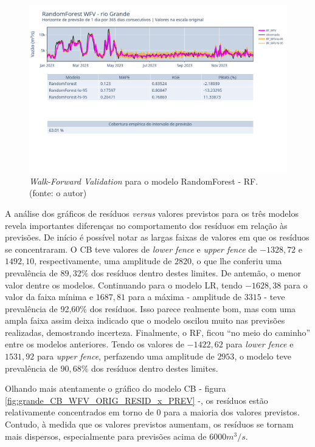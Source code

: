 \begin{figure}[!h]
	\centering
	\includegraphics[scale=0.33]{Figuras/rio_grande/wfv/RF/RF_WFV_ORIG.png}
	\caption{\textit{Walk-Forward Validation} para o modelo RandomForest - RF.\\(fonte: o autor)}
	\label{fig:grande_RF_WFV_ORIG}
\end{figure}
\clearpage

A análise dos gráficos de resíduos \textit{versus} valores previstos para os três modelos revela importantes diferenças no comportamento dos resíduos em relação às previsões. De início é possível notar as largas faixas de valores em que os resíduos se concentraram. O CB teve valores de \textit{lower fence} e \textit{upper fence} de $-1328,72$ e $1492,10$, respectivamente, uma amplitude de $2820$, o que lhe conferiu uma prevalência de $89,32\%$ dos resíduos dentro destes limites. De antemão, o menor valor dentre os modelos. Continuando para o modelo LR, tendo $-1628,38$ para o valor da faixa mínima e $1687,81$ para a máxima - amplitude de $3315$ - teve prevalência de 92,60\% dos resíduos. Isso parece realmente bom, mas com uma ampla faixa assim deixa indicado que o modelo oscilou muito nas previsões realizadas, demostrando incerteza. Finalmente, o RF, ficou ``no meio do caminho'' entre os modelos anteriores. Tendo os valores de $-1422,62$ para \textit{lower fence} e $1531,92$ para \textit{upper fence}, perfazendo uma amplitude de $2953$, o modelo teve prevalência de $90,68\%$ dos resíduos dentro destes limites.

Olhando mais atentamente o gráfico do modelo CB - figura \ref{fig:grande_CB_WFV_ORIG_RESID_x_PREV} -, os resíduos estão relativamente concentrados em torno de $0$ para a maioria dos valores previstos. Contudo, à medida que os valores previstos aumentam, os resíduos se tornam mais dispersos, especialmente para previsões acima de $6000 m^3/s$. 

